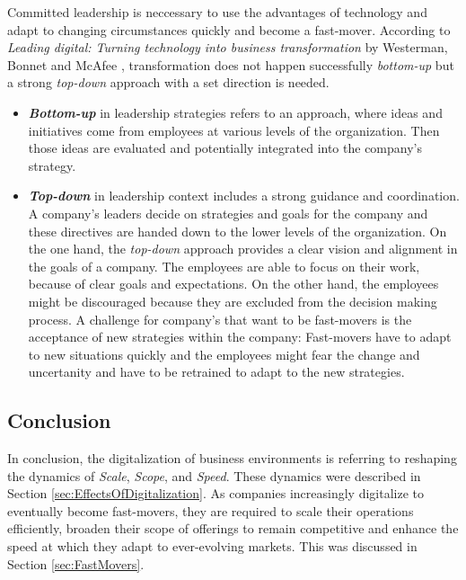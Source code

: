 \documentclass[a4]{scrartcl}
\begin{document}
	
	Committed leadership is neccessary to use the advantages of technology and adapt to changing circumstances quickly and become a fast-mover. According to \textit{Leading digital: Turning technology into business transformation} by Westerman, Bonnet and McAfee \cite{leadingdigital}, transformation does not happen successfully \textit{bottom-up} but a strong \textit{top-down} approach with a set direction is needed.


	\begin{itemize}
		
		\item \textit{\textbf{Bottom-up}} in leadership strategies refers to an approach, where ideas and initiatives come from employees at various levels of the organization. Then those ideas are evaluated and potentially integrated into the company's strategy.~\cite{tdbu}
		
		\item \textit{\textbf{Top-down}} in leadership context includes a strong guidance and coordination. A company's leaders decide on strategies and goals for the company and these directives are handed down to the lower levels of the organization.
		On the one hand, the \textit{top-down} approach provides a clear vision and alignment in the goals of a company. The employees are able to focus on their work, because of clear goals and expectations. On the other hand, the employees might be discouraged because they are excluded from the decision making process.
		A challenge for company's that want to be fast-movers is the acceptance of new strategies within the company: Fast-movers have to adapt to new situations quickly and the employees might fear the change and uncertanity and have to be retrained to adapt to the new strategies.~\cite{tdbu, leadingdigital}
		
		
	\end{itemize}
	
	\subsection{Conclusion} \label{subsec:conc}
	
	In conclusion, the digitalization of business environments is referring to reshaping the dynamics of \textit{Scale}, \textit{Scope}, and \textit{Speed}. These dynamics were described in Section \ref{sec:EffectsOfDigitalization}. As companies increasingly digitalize to eventually become fast-movers, they are required to scale their operations efficiently, broaden their scope of offerings to remain competitive and enhance the speed at which they adapt to ever-evolving markets. This was discussed in Section \ref{sec:FastMovers}.
	
\end{document}
